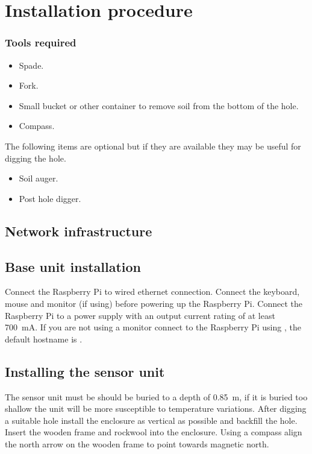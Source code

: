 \chapter{Installation procedure}

\subsection{Tools required}

\begin{itemize}
\item Spade.
\item Fork.
\item Small bucket or other container to remove soil from the bottom
  of the hole.
\item Compass.
\end{itemize}

The following items are optional but if they are available they may be
useful for digging the hole.
\begin{itemize}
\item Soil auger.
\item Post hole digger.
\end{itemize}

\section{Network infrastructure}
\todo

\section{Base unit installation}

Connect the Raspberry Pi to wired ethernet connection. Connect the
keyboard, mouse and monitor (if using) before powering up the
Raspberry Pi. Connect the Raspberry Pi to a  power supply with
an output current rating of at least \SI{700}{\milli A}. If you are
not using a monitor connect to the Raspberry Pi using \ssh, the
default hostname is .


\section{Installing the sensor unit}

The sensor unit must be should be buried to a depth of
\SI{0.85}{\metre}, if it is buried too shallow the unit will be more
susceptible to temperature variations. After digging a suitable hole install the enclosure as vertical as
possible and backfill the hole. Insert the wooden frame and rockwool
into the enclosure. Using a compass align the north arrow on the
wooden frame to point towards magnetic north. 





